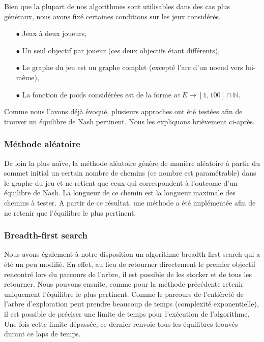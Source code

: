 Bien que la plupart de nos algorithmes sont utilisables dans des cas plus généraux, nous avons fixé certaines conditions sur les jeux considérés.

\begin{itemize}	
	\item[$\bullet$] Jeux à deux joueurs,
	\item[$\bullet$] Un seul objectif par joueur (ces deux objectifs étant différents), 
	\item[$\bullet$] Le graphe du jeu est un graphe complet (excepté l'arc d'un noeud vers lui-même),
	\item[$\bullet$] La fonction de poids considérées est de la forme $w : E \rightarrow [1,100] \cap \mathbb{N} $.
\end{itemize}

Comme nous l'avons déjà évoqué, plusieurs approches ont été testées afin de trouver un équilibre de Nash pertinent. Nous les expliquons brièvement ci-après.

\subsubsection*{Méthode aléatoire}
De loin la plus naïve, la méthode aléatoire génère de manière aléatoire à partir du sommet initial un certain nombre de chemins (ce nombre est paramétrable) dans le graphe du jeu et ne retient que ceux qui correspondent à l'outcome d'un équilibre de Nash. La longueur de ce chemin est la longueur maximale des chemins à tester. A partir de ce résultat, une méthode a été implémentée afin de ne retenir que l'équilibre le plus pertinent.

\subsubsection*{Breadth-first search}
Nous avons également à notre disposition un algorithme breadth-first search qui a été un peu modifié. En effet, au lieu de retourner directement le premier objectif rencontré lors du parcours de l'arbre, il est possible de les stocker et de tous les retourner. Nous pouvons ensuite, comme pour la méthode précédente retenir uniquement l'équilibre le plus pertinent. Comme le parcours de l'entièreté de l'arbre d'exploration peut prendre beaucoup de temps  (complexité exponentielle), il est possible de préciser une limite de temps pour l'exécution de l'algorithme. Une fois cette limite dépassée, ce dernier renvoie tous les équilibres trouvés durant ce laps de temps.

